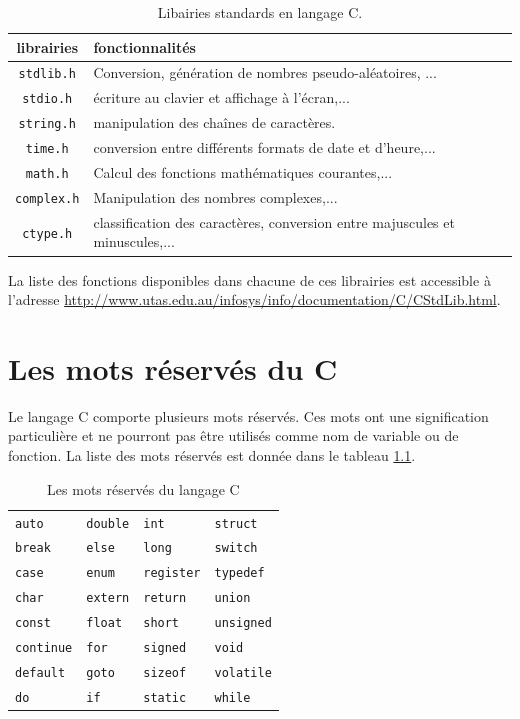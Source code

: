 \documentclass[a4paper,11pt]{book}
\theoremstyle{definition}
\begin{document}
\begin{table}[!h]
\centering
\begin{tabular}{cp{10cm}}
  \hline
  \textbf{librairies} & fonctionnalités\\
  \hline
\texttt{stdlib.h}&Conversion, génération de nombres pseudo-aléatoires, ...\\
\texttt{stdio.h}& écriture au clavier et affichage à l'écran,...\\
\texttt{string.h}&manipulation des chaînes de caractères.\\
\texttt{time.h}& conversion entre différents formats de date et d'heure,...\\
\texttt{math.h}& Calcul des fonctions mathématiques courantes,...\\
\texttt{complex.h}&Manipulation des nombres complexes,...\\
\texttt{ctype.h}&classification des caractères, conversion entre majuscules et minuscules,...\\
  \hline
\end{tabular}
\caption{Libairies standards en langage C.\label{lib}}
\end{table}

La liste des fonctions disponibles dans chacune de ces librairies est accessible à l'adresse \url{http://www.utas.edu.au/infosys/info/documentation/C/CStdLib.html}. 

\chapter{Les mots réservés du C}
\label{motreserve}
Le langage C comporte plusieurs mots réservés. Ces mots ont une signification particulière et ne pourront pas être utilisés comme nom de variable ou de fonction. La liste des mots réservés est donnée dans le tableau \ref{res}.

\begin{table}[!h]
\centering
\begin{tabular}{p{3cm}p{3cm}p{3cm}p{3cm}}
  \hline
\texttt{auto}&\texttt{double}&\texttt{int}&\texttt{struct}\\
\texttt{break} &\texttt{else}&\texttt{long}&\texttt{switch}\\
\texttt{case}&\texttt{enum}&\texttt{register}&\texttt{typedef}\\
\texttt{char}&\texttt{extern}&\texttt{return}&\texttt{union}\\
\texttt{const}&\texttt{float}&\texttt{short}&\texttt{unsigned}\\
\texttt{continue}&\texttt{for}&\texttt{signed}&\texttt{void}\\
\texttt{default}&\texttt{goto}&\texttt{sizeof}&\texttt{volatile}\\
\texttt{do}&\texttt{if}&\texttt{static}&\texttt{while}\\ 
  \hline
\end{tabular}
\caption{Les mots réservés du langage C\label{res}}
\end{table}
\end{document}
